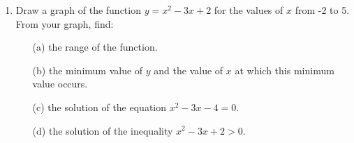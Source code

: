 \begin{enumerate}
	\item Draw a graph of the function $y = x^2 - 3x + 2$ for the values of $x$ from -2 to 5. From your graph, find:
		\begin{itemize}
		\item[(a)] the range of the function.
		\item[(b)] the minimum value of $y$ and the value of $x$ at which this minimum value occurs.
		\item[(c)] the solution of the equation $x^2 - 3x - 4 = 0$.
		\item[(d)] the solution of the inequality $x^2 - 3x + 2 > 0$.
		\end{itemize}
		


\end{enumerate}	
	
	
	
	
